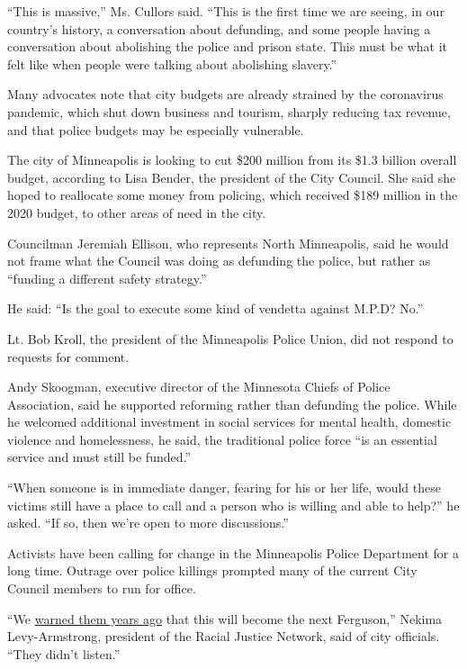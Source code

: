 ``This is massive,'' Ms. Cullors said. ``This is the first time we are
seeing, in our country's history, a conversation about defunding, and
some people having a conversation about abolishing the police and prison
state. This must be what it felt like when people were talking about
abolishing slavery.''

Many advocates note that city budgets are already strained by the
coronavirus pandemic, which shut down business and tourism, sharply
reducing tax revenue, and that police budgets may be especially
vulnerable.

The city of Minneapolis is looking to cut \$200 million from its \$1.3
billion overall budget, according to Lisa Bender, the president of the
City Council. She said she hoped to reallocate some money from policing,
which received \$189 million in the 2020 budget, to other areas of need
in the city.

Councilman Jeremiah Ellison, who represents North Minneapolis, said he
would not frame what the Council was doing as defunding the police, but
rather as ``funding a different safety strategy.''

He said: ``Is the goal to execute some kind of vendetta against M.P.D?
No.''

Lt. Bob Kroll, the president of the Minneapolis Police Union, did not
respond to requests for comment.

Andy Skoogman, executive director of the Minnesota Chiefs of Police
Association, said he supported reforming rather than defunding the
police. While he welcomed additional investment in social services for
mental health, domestic violence and homelessness, he said, the
traditional police force ``is an essential service and must still be
funded.''

``When someone is in immediate danger, fearing for his or her life,
would these victims still have a place to call and a person who is
willing and able to help?'' he asked. ``If so, then we're open to more
discussions.''

Activists have been calling for change in the Minneapolis Police
Department for a long time. Outrage over police killings prompted many
of the current City Council members to run for office.

``We
\href{https://www.washingtonpost.com/news/wonk/wp/2015/11/24/why-activists-predicted-months-ago-that-minneapolis-could-become-the-next-ferguson/)}{warned
them years ago} that this will become the next Ferguson,'' Nekima
Levy-Armstrong, president of the Racial Justice Network, said of city
officials. ``They didn't listen.''

